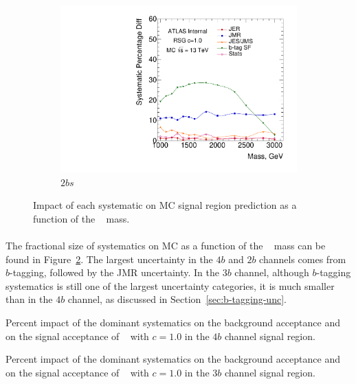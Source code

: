 \begin{figure}[htb!]
\begin{subfigure}[b]{0.45\textwidth}
        \includegraphics[width=\textwidth,angle=-90]{figures/boosted/Syst_MC/TwoTag_split_RSG_syst.pdf}
        \caption{$2bs$}
        \label{fig:signal_syst_summary-2b}
    \end{subfigure}
  \caption{Impact of each systematic on MC signal region prediction as a function of the \Grav~ mass.}
  \label{fig:signal_syst_summary}
\end{figure}

\paragraph{}
The fractional size of systematics on MC as a function of the \Grav~ mass can be found in Figure~\ref{fig:signal_syst_summary}.
The largest uncertainty in the $4b$ and $2b$ channels comes from $b$-tagging, followed by the JMR uncertainty.
In the $3b$ channel, although $b$-tagging systematics is still one of the largest uncertainty categories, it is much smaller than in the $4b$ channel, as discussed in Section~\ref{sec:b-tagging-unc}. 


\begin{table}[htb!]
\begin{center}
\caption{Percent impact of the dominant systematics on the background acceptance
         and on the signal acceptance of \Grav~ with $c=1.0$ in the $4b$ channel signal region.}

\label{tab:summary-systematics-4b}
\end{center}
\end{table}

\begin{table}[htb!]
\begin{center}
\caption{Percent impact of the dominant systematics on the background acceptance
         and on the signal acceptance of \Grav~ with $c=1.0$ in the $3b$ channel signal region.}

\label{tab:summary-systematics-3b}
\end{center}
\end{table}

